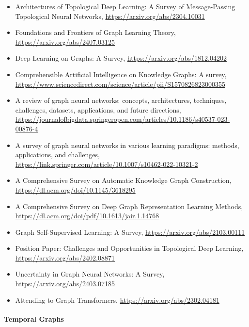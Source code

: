 \begin{itemize}
\item Architectures of Topological Deep Learning: A Survey of Message-Passing Topological Neural Networks, \url{https://arxiv.org/abs/2304.10031}

\item Foundations and Frontiers of Graph Learning Theory, \url{https://arxiv.org/abs/2407.03125}

\item Deep Learning on Graphs: A Survey,
\url{https://arxiv.org/abs/1812.04202}

\item Comprehensible Artificial Intelligence on Knowledge Graphs: A survey, \url{https://www.sciencedirect.com/science/article/pii/S1570826823000355}
  
\item A review of graph neural networks: concepts, architectures, techniques, challenges, datasets, applications, and future directions, \url{https://journalofbigdata.springeropen.com/articles/10.1186/s40537-023-00876-4}

\item A survey of graph neural networks in various learning paradigms: methods, applications, and challenges, \url{https://link.springer.com/article/10.1007/s10462-022-10321-2}

\item A Comprehensive Survey on Automatic Knowledge Graph Construction, \url{https://dl.acm.org/doi/10.1145/3618295}

\item A Comprehensive Survey on Deep Graph Representation Learning Methods, \url{https://dl.acm.org/doi/pdf/10.1613/jair.1.14768}

\item Graph Self-Supervised Learning: A Survey, \url{https://arxiv.org/abs/2103.00111}

\item Position Paper: Challenges and Opportunities in Topological Deep Learning, \url{https://arxiv.org/abs/2402.08871}

\item Uncertainty in Graph Neural Networks: A Survey, \url{https://arxiv.org/abs/2403.07185}

\item Attending to Graph Transformers, \url{https://arxiv.org/abs/2302.04181}
\end{itemize}

\paragraph{Temporal Graphs}

